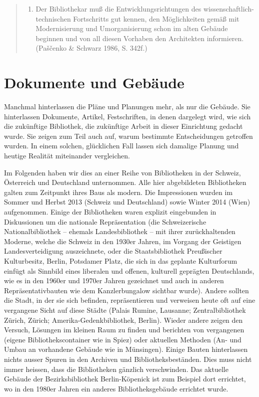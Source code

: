 \documentclass[a4paper,
fontsize=11pt,
oneside,
numbers=noperiodatend,
parskip=half-,
bibliography=totoc,
final
]{scrartcl}
\begin{document}
\begin{quote}
\begin{enumerate}
\def\labelenumi{\arabic{enumi}.}
\setcounter{enumi}{7}
\itemsep1pt\parskip0pt
\item
  Der Bibliothekar muß die Entwicklungsrichtungen des
  wissenschaftlich-technischen Fortschritts gut kennen, den
  Möglichkeiten gemäß mit Modernisierung und Umorganisierung schon im
  alten Gebäude beginnen und von all diesen Vorhaben den Architekten
  informieren. (Paščenko \& Schwarz 1986, S. 342f.)
\end{enumerate}
\end{quote}


\section*{Dokumente und Gebäude}\label{dokumente-und-gebuxe4ude}

Manchmal hinterlassen die Pläne und Planungen mehr, als nur die Gebäude.
Sie hinterlassen Dokumente, Artikel, Festschriften, in denen dargelegt
wird, wie sich die zukünftige Bibliothek, die zukünftige Arbeit in
dieser Einrichtung gedacht wurde. Sie zeigen zum Teil auch auf, warum
bestimmte Entscheidungen getroffen wurden. In einem solchen, glücklichen
Fall lassen sich damalige Planung und heutige Realität miteinander
vergleichen.

Im Folgenden haben wir dies an einer Reihe von Bibliotheken in der
Schweiz, Österreich und Deutschland unternommen. Alle hier abgebildeten
Bibliotheken galten zum Zeitpunkt ihres Baus als modern. Die
Impressionen wurden im Sommer und Herbst 2013 (Schweiz und Deutschland)
sowie Winter 2014 (Wien) aufgenommen. Einige der Bibliotheken waren
explizit eingebunden in Diskussionen um die nationale Repräsentation
(die Schweizerische Nationalbibliothek -- ehemals Landesbibliothek --
mit ihrer zurückhaltenden Moderne, welche die Schweiz in den 1930er
Jahren, im Vorgang der Geistigen Landesverteidigung auszeichnete, oder
die Staatsbibliothek Preußischer Kulturbesitz, Berlin, Potsdamer Platz,
die sich in das geplante Kulturforum einfügt als Sinnbild eines
liberalen und offenen, kulturell geprägten Deutschlands, wie es in den
1960er und 1970er Jahren gezeichnet und auch in anderen
Repräsentativbauten wie dem Kanzlerbungalow sichtbar wurde). Andere
sollten die Stadt, in der sie sich befinden, repräsentieren und
verweisen heute oft auf eine vergangene Sicht auf diese Städte (Palais
Rumine, Lausanne; Zentralbibliothek Zürich, Zürich;
Amerika-Gedenkbibliothek, Berlin). Wieder andere zeigen den Versuch,
Lösungen im kleinen Raum zu finden und berichten von vergangenen (eigene
Bibliothekscontainer wie in Spiez) oder aktuellen Methoden (An- und
Umbau an vorhandene Gebäude wie in Münsingen). Einige Bauten
hinterlassen nichts ausser Spuren in den Archiven und
Bibliotheksbeständen. Dies muss nicht immer heissen, dass die
Bibliotheken gänzlich verschwinden. Das aktuelle Gebäude der
Bezirksbibliothek Berlin-Köpenick ist zum Beispiel dort errichtet, wo in
den 1980er Jahren ein anderes Bibliotheksgebäude errichtet wurde.
\end{document}
